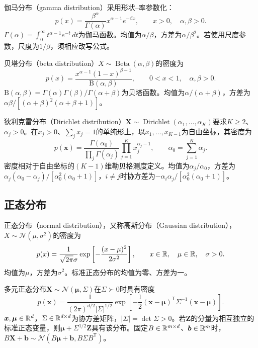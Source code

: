 伽马分布（gamma distribution）采用形状--率参数化：
\begin{equation}
 p(x)=\frac{\beta^\alpha}{\Gamma(\alpha)}x^{\alpha-1}e^{-\beta x},
 \qquad x>0,\quad\alpha,\beta>0.
\end{equation}
$\Gamma(\alpha)=\int_0^\infty t^{\alpha-1}e^{-t}\,dt$为伽马函数。均值为$\alpha/\beta$，方差为$\alpha/\beta^2$。若使用尺度参数，尺度为$1/\beta$，须相应改写公式。

贝塔分布（beta distribution）$X\sim\operatorname{Beta}(\alpha,\beta)$的密度为
\begin{equation}
 p(x)=\frac{x^{\alpha-1}(1-x)^{\beta-1}}{\mathrm B(\alpha,\beta)},
 \qquad0<x<1,\quad\alpha,\beta>0.
\end{equation}
$\mathrm B(\alpha,\beta)=\Gamma(\alpha)\Gamma(\beta)/\Gamma(\alpha+\beta)$为贝塔函数。均值为$\alpha/(\alpha+\beta)$，方差为$\alpha\beta/[(\alpha+\beta)^2(\alpha+\beta+1)]$。

狄利克雷分布（Dirichlet distribution）$\bm X\sim\operatorname{Dirichlet}(\alpha_1,\ldots,\alpha_K)$要求$K\geq2$、$\alpha_j>0$。在$x_j>0$、$\sum_jx_j=1$的单纯形上，以$x_1,\ldots,x_{K-1}$为自由坐标，其密度为
\begin{equation}
 p(\bm x)=\frac{\Gamma(\alpha_0)}{\prod_j\Gamma(\alpha_j)}\prod_{j=1}^Kx_j^{\alpha_j-1},
 \qquad\alpha_0=\sum_{j=1}^K\alpha_j.
\end{equation}
密度相对于自由坐标的$(K-1)$维勒贝格测度定义。均值为$\alpha_j/\alpha_0$，方差为$\alpha_j(\alpha_0-\alpha_j)/[\alpha_0^2(\alpha_0+1)]$，$i\ne j$时协方差为$-\alpha_i\alpha_j/[\alpha_0^2(\alpha_0+1)]$。

\subsection{正态分布}
正态分布（normal distribution），又称高斯分布（Gaussian distribution），$X\sim\mathcal N(\mu,\sigma^2)$的密度为
\begin{equation}
 p(x)=\frac1{\sqrt{2\pi}\sigma}\exp\left[-\frac{(x-\mu)^2}{2\sigma^2}\right],
 \qquad x\in\mathbb{R},\quad\mu\in\mathbb{R},\quad\sigma>0.
\end{equation}
均值为$\mu$，方差为$\sigma^2$。标准正态分布的均值为零、方差为一。

多元正态分布$\bm X\sim\mathcal N(\bm\mu,\Sigma)$在$\Sigma\succ0$时具有密度
\begin{equation}
 p(\bm x)=\frac1{(2\pi)^{d/2}|\Sigma|^{1/2}}
 \exp\left[-\frac12(\bm x-\bm\mu)^{\mathsf T}\Sigma^{-1}(\bm x-\bm\mu)\right].
 \label{eq:math-gaussian-density}
\end{equation}
$\bm x,\bm\mu\in\mathbb{R}^d$，$\Sigma\in\mathbb{R}^{d\times d}$为协方差矩阵，$|\Sigma|=\det\Sigma>0$。若$\bm Z$的分量为相互独立的标准正态变量，则$\bm\mu+\Sigma^{1/2}\bm Z$具有该分布。固定$B\in\mathbb{R}^{m\times d}$、$\bm b\in\mathbb{R}^m$时，$B\bm X+\bm b\sim\mathcal N(B\bm\mu+\bm b,B\Sigma B^{\mathsf T})$。

